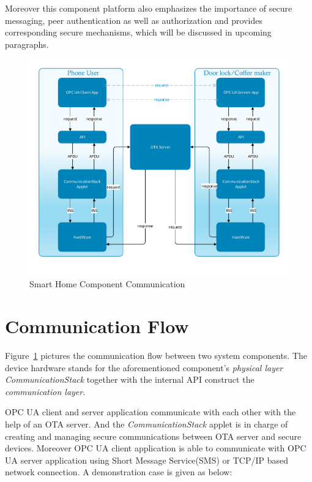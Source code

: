 Moreover this component platform also emphasizes the importance of secure messaging, peer authentication as well as authorization and provides corresponding secure mechanisms, which will be discussed in upcoming paragraphs.

 \begin{figure}[!htb]
	\centering
	\includegraphics[width=1.1\textwidth]{csoverview}
		\caption{Smart Home Component Communication}
	\label{fig:softwareStructure}
\end{figure}

\section{Communication Flow}
Figure~\ref{fig:softwareStructure} pictures the communication flow between two system components.
The device hardware stands for the aforementioned component's \emph{physical layer} \emph{CommunicationStack} together with the {internal API} construct the \emph{communication layer}.  


OPC UA client and server application communicate with each other with the help of an OTA server. And the \emph{CommunicationStack} applet is in charge of creating and managing secure communications between OTA server and secure devices. Moreover OPC UA client application is able to communicate with OPC UA server application using Short Message Service(SMS) or TCP/IP based network connection. A demonstration case is given as below:

